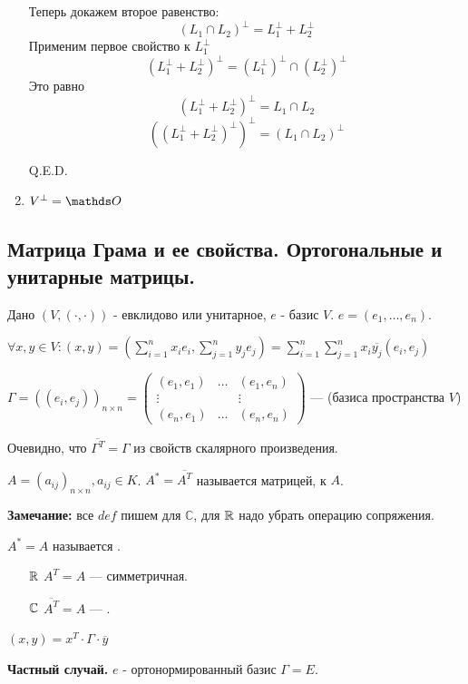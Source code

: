 \begin{enumerate}
    Теперь докажем второе равенство:
$$(L_1 \cap L_2)^\perp = L_1^{\perp}+ L_2^{\perp}$$
    Применим первое свойство к $L_1^{\perp}$ 
    $$(L_1^\perp + L_2^\perp)^\perp = (L_1^\perp)^\perp \cap (L_2^\perp)^\perp$$
   Это равно
    $$(L_1^\perp + L_2^\perp)^\perp = L_1 \cap L_2$$
    $$((L_1^\perp + L_2^\perp)^\perp )^\perp= (L_1 \cap L_2)^\perp$$
        
    
    \hfill Q.E.D.
    \item $V^\perp  = \zero$
\end{enumerate}

\pagebreak
\subsection{Матрица Грама и ее свойства. Ортогональные и унитарные матрицы.}

Дано $(V, (\cdot,\cdot))$ - евклидово или унитарное, $e$ - базис $V$. $e=(e_1,\ldots, e_n)$.

$\forall x,y \in V: (x,y) = (\sum\limits_{i=1}^n x_i e_i, \sum\limits_{j=1}^n y_j e_j) = \sum\limits_{i=1}^n\sum\limits_{j=1}^n x_i \overline{y_j} (e_i, e_j)$

 $\Gamma  = ((e_i,e_j))_{n\times n} = \begin{pmatrix}
    (e_1,e_1) & \ldots & (e_1, e_n)\\
    \vdots & &\vdots\\
    (e_n,e_1) & \ldots & (e_n,e_n)
\end{pmatrix}$ --- (базиса пространства $V$)

Очевидно, что $\overline{\Gamma^T}  = \Gamma$ из свойств скалярного произведения.

 $A = (a_{ij})_{n \times n}, a_{ij} \in K$. $A^* = \overline{A^T}$ называется матрицей,  к $A$.

\textbf{Замечание:} все $def$ пишем для $\mathbb{C}$, для $\mathbb{R}$ надо убрать операцию сопряжения.

 $A^* = A$ называется .
\begin{enumerate}
    \item[$\mathbb{R}$] $A^T = A$ --- симметричная.
    \item[$\mathbb{C}$] $\overline{A^T}=A$  --- .
\end{enumerate}

$(x,y)   = x^T \cdot \Gamma \cdot \overline{y}$

\textbf{Частный случай.} $e$ - ортонормированный базис $\Gamma = E$.

